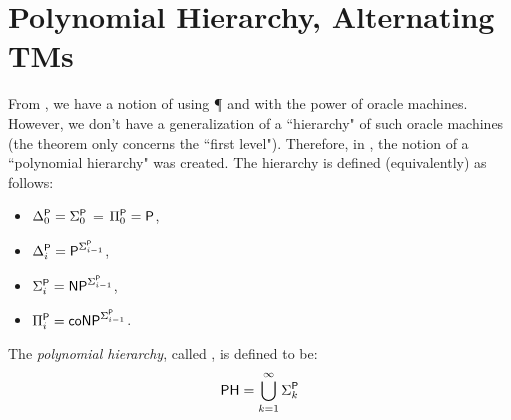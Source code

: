 \section{Polynomial Hierarchy, Alternating TMs}

From , we have a notion of using {\P} and {\NP} with the power of oracle machines. However, we don't have a generalization of a ``hierarchy" of such oracle machines (the theorem only concerns the ``first level"). Therefore, in \cite{originalpolyhierarchypaper}, the notion of a ``polynomial hierarchy" was created. The hierarchy is defined (equivalently) as follows:
\begin{itemize}
\item $\Delta_0^\text{\P} = \Sigma_0^\text{\P}$ = $\Pi_0^\text{\P} = \text{\P}$,
\item $\Delta_i^\text{\P} = \text{\P}^{\Sigma_{i-1}^\text{\P}}$, 
\item $\Sigma_i^\text{\P} = \text{\NP}^{\Sigma_{i-1}^\text{\P}}$, 
\item $\Pi_i^\text{\P} = \text{\coNP}^{\Sigma_{i-1}^\text{\P}}$.
\end{itemize}

\begin{definition}
The \emph{polynomial hierarchy}, called \PH, is defined to be:
\[
\text{\PH} = \bigcup_{k = 1}^{\infty} \Sigma_k^{\text{\P}}
\]
\end{definition}

